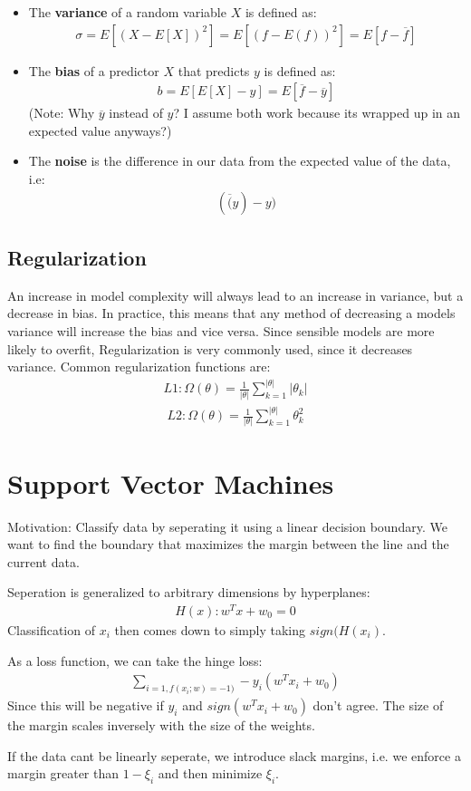 \documentclass{report}
\newcommand{\tbf}{\textbf}
\newcommand*{\newpar}{\par\vspace{\baselineskip}\noindent}
\begin{document}
\begin{itemize}
 \item The \tbf{variance} of a random variable $X$ is defined as:
 \begin{align}
  \sigma = E[(X - E[X])^2] = E[(f - E(f))^2] = E[f - \overline{f}]
 \end{align}
 \item The \tbf{bias} of a predictor $X$ that predicts $y$ is defined as:
 \begin{align}
  b = E[E[X] - y] = E[\overline{f} - \overline{y}]
 \end{align}
 (Note: Why $\overline{y}$ instead of $y$? I assume both work because its wrapped up in an expected value anyways?)
 \item The \tbf{noise} is the difference in our data from the expected value of the data, i.e:
 \begin{align}
  (\overline(y) - y)
 \end{align}
\end{itemize}
\section{Regularization}
An increase in model complexity will always lead to an increase in variance, but a decrease in bias. In practice, this means that any method of decreasing a models variance will increase the bias and vice versa. Since sensible models are more likely to overfit, Regularization is very commonly used, since it decreases variance. Common regularization functions are:
\begin{align}
 L1: \Omega(\theta) = \frac{1}{|\theta|} \sum_{k=1}^{|\theta|} |\theta_k|
\end{align}
\begin{align}
 L2: \Omega(\theta) = \frac{1}{|\theta|} \sum_{k=1}^{|\theta|} \theta_k^2
\end{align}
\chapter{Support Vector Machines}
Motivation: Classify data by seperating it using a linear decision boundary. We want to find the boundary that maximizes the margin between the line and the current data.
\newpar
Seperation is generalized to arbitrary dimensions by hyperplanes:
\begin{align}
 H(x): w^T x + w_0 = 0
\end{align}
Classification of $x_i$ then comes down to simply taking $sign(H(x_i)$.
\newpar
As a loss function, we can take the hinge loss:
\begin{align}
 \sum_{i=1,f(x_i;w) = -1)} -y_i(w^Tx_i + w_0)
\end{align}
Since this will be negative if $y_i$ and $sign(w^Tx_i + w_0)$ don't agree.
The size of the margin scales inversely with the size of the weights.
\newpar
If the data cant be linearly seperate, we introduce slack margins, i.e. we enforce a margin greater than $1 - \xi_i$ and then minimize $\xi_i$.
\end{document}
